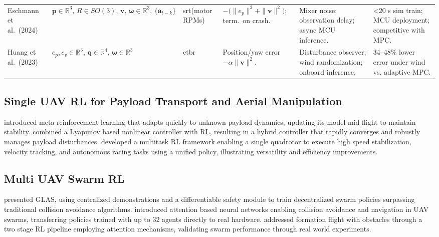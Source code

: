 \begin{table*}[!b]
\begin{tabular}{p{2.0cm}<{\raggedright} p{2.5cm}<{\raggedright} p{2.0cm}<{\raggedright} p{3.0cm}<{\raggedright} p{2.8cm}<{\raggedright} p{2.7cm}<{\raggedright}}
Eschmann et al.\ (2024) \cite{eschmann_learning_2024} & $\mathbf{p}\in\mathbb{R}^3,\,R\in SO(3),\,\mathbf{v},\,\boldsymbol{\omega}\in\mathbb{R}^3,\,\{\mathbf{a}_{t-k}\}$ & \gls{srt}(motor RPMs) & { $-\bigl(\|e_p\|^2 + \|\mathbf{v}\|^2\bigr)$; term.\ on crash.} & { Mixer noise; observation delay; async MCU inference.} & { <20 s sim train; MCU deployment; competitive with MPC.} \\[1ex]

Huang et al.\ (2023) \cite{huang_quadswarm_2023} & $e_p,e_v\in\mathbb{R}^3,\,\mathbf{q}\in\mathbb{R}^4,\,\boldsymbol{\omega}\in\mathbb{R}^3$ & \gls{ctbr}& { Position/yaw error $- \alpha\|\mathbf{v}\|^2$.} & { Disturbance observer; wind randomization; onboard inference.} & { 34–48\% lower error under wind vs. adaptive MPC.} \\
\hline
\end{tabular}
\end{table*}

\subsection{Single UAV RL for Payload Transport and Aerial Manipulation}
\cite{belkhale_model-based_2021} introduced meta reinforcement learning that adapts quickly to unknown payload dynamics, updating its model mid flight to maintain stability. \cite{hua_new_2022} combined a Lyapunov based nonlinear controller with RL, resulting in a hybrid controller that rapidly converges and robustly manages payload disturbances. \cite{xing_multi-task_2024} developed a multitask RL framework enabling a single quadrotor to execute high speed stabilization, velocity tracking, and autonomous racing tasks using a unified policy, illustrating versatility and efficiency improvements.

\subsection{Multi UAV Swarm RL}
\cite{riviere_glas_2020} presented GLAS, using centralized demonstrations and a differentiable safety module to train decentralized swarm policies surpassing traditional collision avoidance algorithms. \cite{huang_collision_2024} introduced attention based neural networks enabling collision avoidance and navigation in UAV swarms, transferring policies trained with up to 32 agents directly to real hardware. \cite{xie_multi-uav_2024} addressed formation flight with obstacles through a two stage RL pipeline employing attention mechanisms, validating swarm performance through real world experiments.

